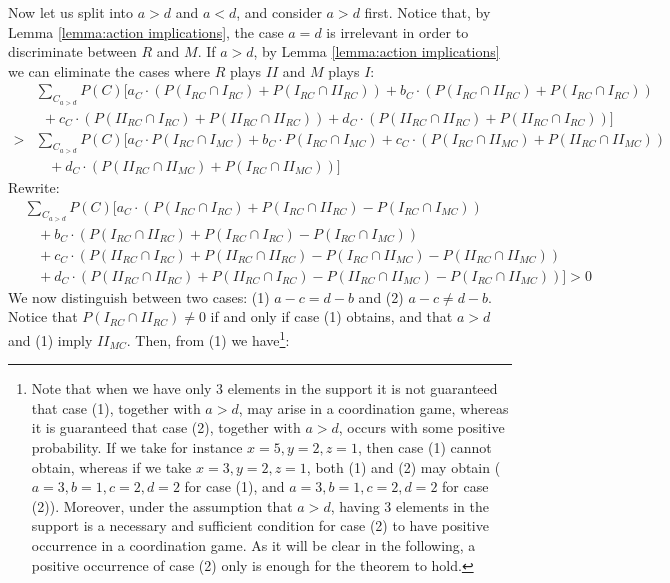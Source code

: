 \documentclass[fleqn,reqno,12pt]{article}
\theoremstyle{Satz}
\theoremstyle{Bsp}
\begin{document}
\noindent Now let us split into $a>d$ and $a<d$, and consider $a>d$ first.  Notice that, by
Lemma \ref{lemma:action implications}, the case $a=d$ is irrelevant in order to discriminate
between $R$ and $M$. If $a>d$, by Lemma \ref{lemma:action implications} we can eliminate the
cases where $R$ plays $II$ and $M$ plays $I$:
\begin{align*}
  & \textstyle{\sum_{C_{a>d}}} P(C)[a_{C} \cdot (P(I_{RC}\cap I_{RC}) + P(I_{RC}\cap II_{RC})) + b_{C} \cdot
  (P(I_{RC}\cap II_{RC}) + P(I_{RC}\cap I_{RC})) \\ 
  & \ \ + c_{C} \cdot (P(II_{RC}\cap I_{RC})
  +P(II_{RC}\cap II_{RC})) + d_{C} \cdot (P(II_{RC}\cap II_{RC})+P(II_{RC}\cap I_{RC}))] \\
  > & 
  \textstyle{\sum_{C_{a>d}}} P(C)[a_{C} \cdot P(I_{RC}\cap I_{MC}) + b_{C} \cdot P(I_{RC}\cap I_{MC}) +
  c_{C} \cdot (P(I_{RC}\cap II_{MC})+P(II_{RC}\cap II_{MC})) \\ 
  & \ \ \ \ + d_{C} \cdot (P(II_{RC}\cap
  II_{MC})+P(I_{RC}\cap II_{MC}))]
\end{align*}
Rewrite:
\begin{align*}
  & \textstyle{\sum_{C_{a>d}}} P(C)[a_{C} \cdot (P(I_{RC}\cap I_{RC}) + P(I_{RC}\cap II_{RC})-
  P(I_{RC}\cap I_{MC})) \\ 
  & \ \ \ \ + b_{C} \cdot (P(I_{RC}\cap II_{RC}) + P(I_{RC}\cap I_{RC})-
  P(I_{RC}\cap I_{MC})) \\ 
  & \ \ \ \ + c_{C} \cdot (P(II_{RC}\cap I_{RC}) +P(II_{RC}\cap II_{RC})-
  P(I_{RC}\cap II_{MC})- P(II_{RC}\cap II_{MC})) \\ 
  & \ \ \ \ + d_{C} \cdot (P(II_{RC}\cap
  II_{RC})+P(II_{RC}\cap I_{RC})- P(II_{RC}\cap II_{MC})- P(I_{RC}\cap II_{MC}))]> 0
\end{align*}
\noindent We now distinguish between two cases: (1) $ a-c = d-b $ and (2) $  a-c \neq d-b $. Notice that $P(I_{RC}\cap II_{RC}) \neq 0$ if and only if case (1) obtains, and that $a>d$ and (1) imply $II_{MC}$. Then, from (1) we have\footnote{Note that when we have only 3 elements in the support it is not guaranteed that case (1), together with $a>d$, may arise in a coordination game, whereas it is guaranteed that case (2), together with $a>d$, occurs with some positive probability. If we take for instance $x= 5, y= 2, z= 1$, then case (1) cannot obtain, whereas if we take $x= 3, y= 2, z= 1$, both (1) and (2) may obtain ($a=3, b=1, c=2, d=2$ for case (1), and $a=3, b=1, c=2, d=2$ for case (2)). Moreover, under the assumption that $a>d$, having 3 elements in the support is a necessary and sufficient condition for case (2) to have positive occurrence in a coordination game. As it will be clear in the following, a positive occurrence of case (2) only is enough for the theorem to hold.}:
\end{document}

